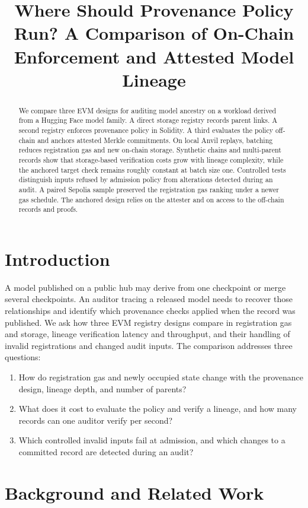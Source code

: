 \documentclass[conference]{IEEEtran}
\title{Where Should Provenance Policy Run? A Comparison of On-Chain Enforcement and Attested Model Lineage}
\author{\IEEEauthorblockN{Author names to be confirmed}
\IEEEauthorblockA{CSCI 435 Research Track}}
\begin{document}
\maketitle

\begin{abstract}
We compare three EVM designs for auditing model ancestry on a workload
derived from a Hugging Face model family. A direct storage registry
records parent links. A second registry enforces provenance policy in
Solidity. A third evaluates the policy off-chain and anchors attested
Merkle commitments. On local Anvil replays, batching reduces
registration gas and new on-chain storage. Synthetic chains and
multi-parent records show that storage-based verification costs grow
with lineage complexity, while the anchored target check remains
roughly constant at batch size one. Controlled tests distinguish inputs
refused by admission policy from alterations detected during an audit.
A paired Sepolia sample preserved the registration gas ranking under
a newer gas schedule. The anchored design relies on the attester and
on access to the off-chain records and proofs.
\end{abstract}


\section{Introduction}
A model published on a public hub may derive from one checkpoint or merge
several checkpoints. An auditor tracing a released model needs to recover
those relationships and identify which provenance checks applied when the
record was published. We ask how three EVM registry designs compare in
registration gas and storage, lineage verification latency and throughput,
and their handling of invalid registrations and changed audit inputs. The comparison addresses
three questions:
\begin{enumerate}
  \item How do registration gas and newly occupied state change with
  the provenance design, lineage depth, and number of parents?
  \item What does it cost to evaluate the policy and verify a lineage,
  and how many records can one auditor verify per second?
  \item Which controlled invalid inputs fail at admission, and which
  changes to a committed record are detected during an audit?
\end{enumerate}

\section{Background and Related Work}
\end{document}
